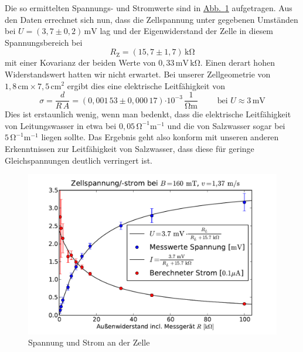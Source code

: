 \documentclass[11pt]{scrartcl}
\newcommand{\unit}[1]{\ensuremath{\,\mathrm{#1}}} %
\newcommand{\ee}[1]{\ensuremath{\cdot\! 10^{#1}}}
\newcommand{\abb}[1]{\hyperref[#1]{Abb.~\ref{#1}}}
\begin{document}
Die so ermittelten Spannungs- und Stromwerte sind in \abb{fig:strom} aufgetragen.
Aus den Daten errechnet sich nun, dass die Zellspannung unter gegebenen Umständen bei $U = (3,7 \pm 0,2)\unit{mV}$ lag und der Eigenwiderstand der Zelle in diesem Spannungsbereich bei
\begin{equation}
R_{\text{Z}} = (15,7 \pm 1,7)\unit{k\Omega}
\end{equation}
mit einer Kovarianz der beiden Werte von $0,33\unit{mV}\unit{k\Omega}$.
Einen derart hohen Widerstandswert hatten wir nicht erwartet.
Bei unserer Zellgeometrie von \\$1,8\unit{cm}\times 7,5\unit{cm^2}$ ergibt dies eine elektrische Leitfähigkeit von
\begin{equation}
\sigma
= \frac{d}{R\,A}
= (0,001\,53 \pm 0,000\,17)\ee{-3}\unit{\frac{1}{\Omega m}}
\qquad
\text{ bei } U\approx 3\unit{mV}
\label{eqn:sigma}
\end{equation}
Dies ist erstaunlich wenig, wenn man bedenkt, dass die elektrische Leitfähigkeit von Leitungswasser in etwa bei $0,05\unit{\Omega^{-1}m^{-1}}$ und die von Salzwasser sogar bei $5\unit{\Omega^{-1}m^{-1}}$ liegen sollte.
Das Ergebnis geht also konform mit unseren anderen Erkenntnissen zur Leitfähigkeit von Salzwasser, dass diese für geringe Gleichspannungen deutlich verringert ist.

\begin{figure}[H]
\begin{center}
\includegraphics[width=1.0\textwidth]{images/strom.pdf}
\end{center}
\vspace{-1.5\baselineskip}
\caption{Spannung und Strom an der Zelle}
\label{fig:strom}
\end{figure}
\end{document}
